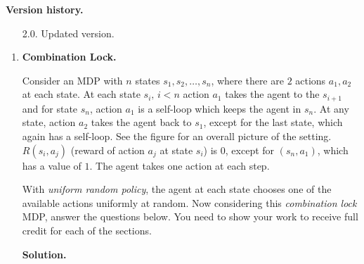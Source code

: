 \documentclass{article}
\theoremstyle{definition}
\theoremstyle{remark}
\newenvironment{Q}
{%
\clearpage
\item
}
{%
\phantom{s}%
\bigskip%
\noindent\textbf{Solution.}
}
\begin{document}
\noindent\textbf{Version history.}
\begin{enumerate}
    \item[2.0.] Updated version.
\end{enumerate}

\begin{enumerate}[font={\Large\bfseries},left=0pt]

\begin{Q}
  \textbf{\Large{}Combination Lock.}

    Consider an MDP with $n$ states $s_1, s_2, \dots, s_n$, where there are $2$ actions $a_1, a_2$ at each state. At each state $s_i,\, i < n$ action $a_1$ takes the agent to the $s_{i+1}$ and for state $s_n$, action $a_1$ is a self-loop which keeps the agent in $s_n$. At any state, action $a_2$ takes the agent back to $s_1$, except for the last state, which again has a self-loop. See the figure for an overall picture of the setting. $R(s_i, a_j)$ (reward of action $a_j$ at state $s_i$) is $0$, except for $(s_n, a_1)$, which has a value of $1$. The agent takes one action at each step. 

    With \textit{uniform random policy}, the agent at each state chooses one of the available actions uniformly at random. Now considering this \textit{combination lock} MDP, answer the questions below. You need to show your work to receive full credit for each of the sections.


\vspace{15pt}

    \begin{figure}[h]
    \centering
    \end{figure}

\vspace{15pt}


\end{Q}
\end{enumerate}
\end{document}
